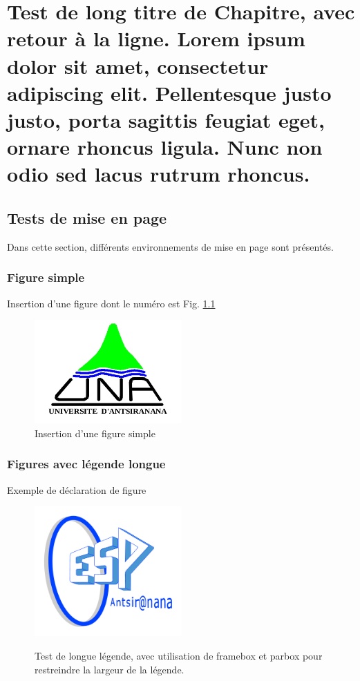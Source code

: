 \chapter{Test de long titre de Chapitre, avec retour à la ligne. Lorem ipsum dolor sit amet, consectetur adipiscing elit. Pellentesque justo justo, porta sagittis feugiat eget, ornare rhoncus ligula. Nunc non odio sed lacus rutrum rhoncus.}


\section{Tests de mise en page}

Dans cette section, différents environnements de mise en page sont présentés.

\subsection{Figure simple}

    Insertion d'une figure dont le numéro est Fig. \ref{figureSimple}
    \begin{figure}
    	\centering %
    	\includegraphics[width=0.5\textwidth]{figures/logoUNA.jpg}
            \caption{Insertion d'une figure simple}\label{figureSimple}
    \end{figure}

\lipsum[1]
\subsection{Figures avec légende longue}
    Exemple de déclaration de figure
    \begin{figure}
        \centering %
        \includegraphics[width=0.5\textwidth]{figures/logoESPA.png} %
        \\ \parbox{0.75\textwidth}{\caption{Test de longue légende, avec utilisation de framebox et parbox pour restreindre la largeur de la légende.}\label{logoESPA}} %
    \end{figure}
\lipsum[2]
